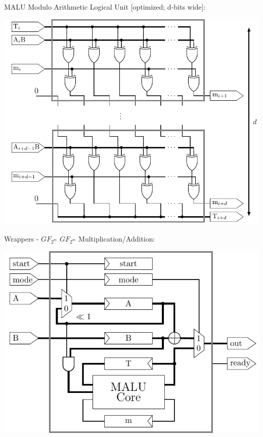 \documentclass{beamer}
\begin{document}
\begin{frame}{MALU}
	Modulo Arithmetic Logical Unit [optimized; d-bits wide]:\\
	\begin{center}
		\includegraphics[height=0.55\paperheight]{images/malu-core-optimized-d}
	\end{center}
\end{frame}

\begin{frame}{Wrappers - $GF_{2^m}$}
	$GF_{2^m}$ Multiplication/Addition:\\
	\begin{center}
		\includegraphics[height=0.55\paperheight]{images/malu-wrapper-gf2m}
	\end{center}
\end{frame}
\end{document}
